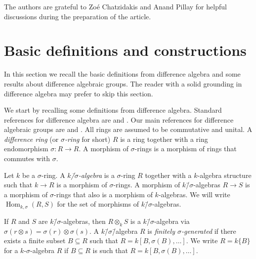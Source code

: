 \documentclass[oneside,reqno]{amsart}
\theoremstyle{definition}
\newcommand{\Hom}{\operatorname{Hom}}
\newcommand{\s}{\sigma}
\newcommand{\ks}{$k$\=/$\s$}
\newcommand{\mw}[1]{\todo[inline,color=green!20!white]{\textbf{Michael:} #1}}
\begin{document}
The authors are grateful to Zo\'{e} Chatzidakis and Anand Pillay for helpful discussions during the preparation of the article.





\section{Basic definitions and constructions}
\label{sec: Basic definition}





In this section we recall the basic definitions from difference algebra and some results about difference algebraic groups. The reader with a solid grounding in difference algebra may prefer to skip this section.



We start by recalling some definitions from difference algebra. Standard references for difference algebra are \cite{Cohn:difference} and \cite{Levin:difference}. Our main references for difference algebraic groups are \cite{Wibmer:FinitenessPropertiesOfAffineDifferenceAlgebraicGroups} and \cite{Wibmer:almostsimple}. All rings are assumed to be commutative and unital. A \emph{difference ring} (or \emph{$\s$-ring} for short) $R$ is a ring together with a ring endomorphism $\s\colon R\to R$. A morphism of $\s$-rings is a morphism of rings that commutes with $\s$.


Let $k$ be a $\s$-ring. A \emph{\ks-algebra} is a $\s$-ring $R$ together with a $k$-algebra structure such that $k\to R$ is a morphism of $\s$-rings. A morphism of \ks-algebras $R\to S$ is a morphism of $\s$-rings that also is a morphism of $k$-algebras. We will write $\Hom_{k,\s}(R,S)$ for the set of morphisms of \ks-algebras.

 If $R$ and $S$ are \ks-algebras, then $R\otimes_k S$ is a \ks-algebra via $\s(r\otimes s)=\s(r)\otimes \s(s)$. A \ks\=/algebra $R$ is \emph{finitely $\s$-generated} if there exists a finite subset $B\subseteq R$ such that $R=k[B,\s(B),\ldots]$. We write $R=k\{B\}$ for a $k$-$\s$-algebra $R$ if $B\subseteq R$ is such that $R=k[B,\s(B),\ldots]$.
\end{document}
